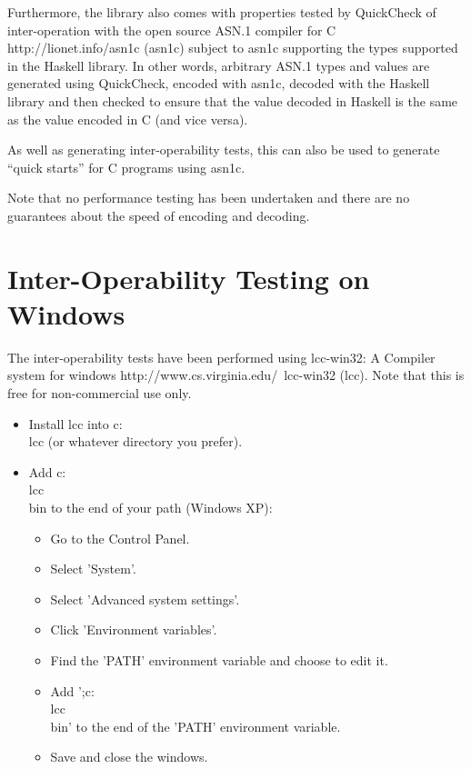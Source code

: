 \documentclass{article}
\begin{document}
Furthermore, the library also comes with properties tested by QuickCheck of inter-operation with
\htmladdnormallinkfoot
{the open source ASN.1 compiler for C}
{http://lionet.info/asn1c}
(asn1c) subject to asn1c supporting the types supported in the Haskell
library. In other words, arbitrary ASN.1 types and values are generated using QuickCheck,
encoded with asn1c, decoded with the Haskell library and then checked
to ensure that the value decoded in Haskell is the same as the value
encoded in C (and vice versa). 

As well as generating inter-operability tests,
this can also be used to generate ``quick starts'' for C programs using asn1c.

Note that no performance testing has been undertaken and there are no
guarantees about the speed of encoding and decoding.

\section{Inter-Operability Testing on Windows}

The inter-operability tests have been performed using
\htmladdnormallinkfoot
{lcc-win32: A Compiler system for windows}
{http://www.cs.virginia.edu/~lcc-win32}
(lcc). Note that this is free for non-commercial use only.

\begin{itemize}
\item
Install lcc into c:\\lcc (or whatever directory you prefer).
\item
Add c:\\lcc\\bin to the end of your path (Windows XP):
\begin{itemize}
\item
Go to the Control Panel.
\item
Select 'System'.
\item
Select 'Advanced system settings'.
\item
Click 'Environment variables'.
\item
Find the 'PATH' environment variable and choose to edit it.
\item
Add ';c:\\lcc\\bin' to the end of the 'PATH' environment variable.
\item
Save and close the windows.
\end{itemize}
\end{itemize}
\end{document}
